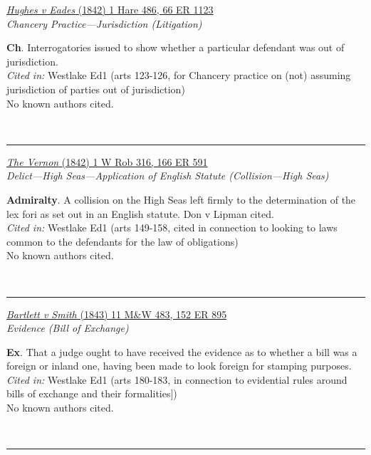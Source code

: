 \documentclass[twoside]{article}
\begin{document}
        \begin{small}
        \begin{center}
        \href{https://heinonline.org/HOL/P?h=hein.engrep/engre0066&i=1129}{\textit{Hughes v Eades} (1842) 1 Hare 486, 66 ER 1123} \label{96} \\ 
\textit{Chancery Practice---Jurisdiction (Litigation)}\\
        \end{center}
        \textbf{Ch}. Interrogatories issued to show whether a particular defendant was out of jurisdiction.\\\textit{Cited in: }Westlake Ed1 (arts 123-126, for Chancery practice on (not) assuming jurisdiction of parties out of jurisdiction)\\No known authors cited.
        \end{small}\\
        \rule{\textwidth}{0.5pt}
        

        \begin{small}
        \begin{center}
        \href{https://heinonline.org/HOL/P?h=hein.engrep/engri0166&i=595}{\textit{The Vernon} (1842) 1 W Rob 316, 166 ER 591} \label{101} \\ 
\textit{Delict---High Seas---Application of English Statute (Collision---High Seas)}\\
        \end{center}
        \textbf{Admiralty}. A collision on the High Seas left firmly to the determination of the lex fori as set out in an English statute. Don v Lipman cited.\\\textit{Cited in: }Westlake Ed1 (arts 149-158, cited in connection to looking to laws common to the defendants for the law of obligations)\\No known authors cited.
        \end{small}\\
        \rule{\textwidth}{0.5pt}
        

        \begin{small}
        \begin{center}
        \href{https://heinonline.org/HOL/P?h=hein.engrep/engrh0152&i=899}{\textit{Bartlett v Smith} (1843) 11 M\&W 483, 152 ER 895} \label{82} \\ 
\textit{Evidence (Bill of Exchange)}\\
        \end{center}
        \textbf{Ex}. That a judge ought to have received the evidence as to whether a bill was a foreign or inland one, having been made to look foreign for stamping purposes.\\\textit{Cited in: }Westlake Ed1 (arts 180-183, in connection to evidential rules around bills of exchange and their formalities])\\No known authors cited.
        \end{small}\\
        \rule{\textwidth}{0.5pt}
        
\end{document}
